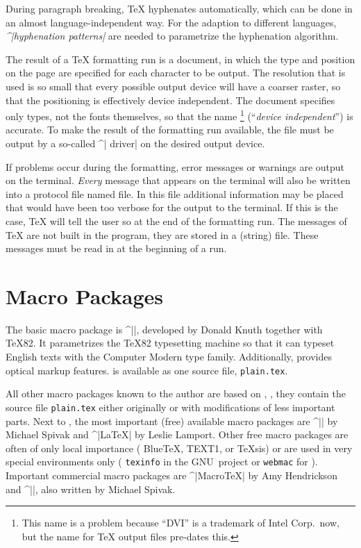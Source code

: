 During paragraph breaking, \TeX{} hyphenates automatically, which
can be done in an almost language-independent way. For the adaption to
different languages, {\it ^|hyphenation patterns|\/} are needed to
parametrize the hyphenation algorithm.

The result of a \TeX{} formatting run is a  document, in which
the type and position on the page are specified for each character to
be output. The resolution that is used is so small that
every possible output device will have a coarser raster, so that the
positioning is effectively device independent. The \DVI{} document
specifies only types, not the fonts themselves, so that the name \DVI{}%
   \footnote{
      This name is a problem because ``DVI'' is a trademark of 
      Intel Corp.\ now, but the name \DVI{} for \TeX{} output files 
      pre-dates this.
      }
 (``{\sl device independent\/}'') is accurate. To make the result of
the formatting run available, the \DVI{} file must be output by a
so-called ^|\DVI{} driver| on the desired output device.

If problems occur during the formatting, error messages or warnings
are output on the terminal. {\it Every\/} message that appears on the
terminal will also be written into a protocol file named 
file. In this \LOG{} file additional information may be placed that
would have been too verbose for the output to the terminal. If this
is the case, \TeX{} will tell the user so at the end of the
formatting run. The messages of \TeX{} are not built in the program,
they are stored in a (string)  file. These messages must
be read in at the beginning of a run.



\section{Macro Packages}
The basic macro package is ^|\Plain|, developed by {\sc Donald Knuth}
together with \TeX82. It parametrizes the \TeX82 typesetting machine
so that it can typeset English texts with the Computer Modern type
family. Additionally, \Plain{} provides optical markup features.
\Plain{} is available as one source file, {\tt plain.tex}.

All other macro packages known to the author are based on \Plain{},
\ie{}, they contain the source file {\tt plain.tex\/} either
originally or with modifications of less important parts. Next to
\Plain{}, the most important (free) available macro packages are
^|\AmSTeX{}| by {\sc Michael Spivak} and ^|\LaTeX{}| by {\sc Leslie
Lamport}. Other free macro packages are often of only local
importance (\eg{} Blue\TeX{}, TEXT1, or \TeX{}sis) or are used in
very special environments only (\eg{} {\tt texinfo\/} in the
GNU~project or {\tt webmac\/} for \WEB{}). Important commercial macro
packages are ^|Macro\TeX{}| by {\sc Amy Hendrickson} and
^|\LAMSTeX{}|, also written by {\sc Michael Spivak}.

